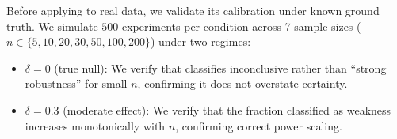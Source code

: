 Before applying \ours to real data, we validate its calibration under known ground
truth. We simulate $500$ experiments per condition across 7 sample sizes
($n \in \{5, 10, 20, 30, 50, 100, 200\}$) under two regimes:
\begin{itemize}[leftmargin=*,itemsep=0pt,topsep=2pt]
\item $\delta = 0$ (true null): We verify that \ours classifies inconclusive rather
than ``strong robustness'' for small $n$, confirming it does not overstate certainty.
\item $\delta = 0.3$ (moderate effect): We verify that the fraction classified as
weakness increases monotonically with $n$, confirming correct power scaling.
\end{itemize}

